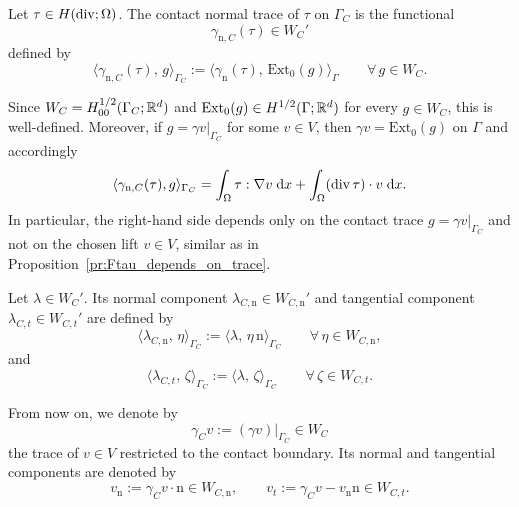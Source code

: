\begin{definition}\label{def:normtang}
	Let $\tau\in H(\diver;\Omega)$. The contact normal trace of $\tau$ on $\Gamma_C$ is the functional
	\begin{equation*}
		\gamma_{\mathrm n,C}(\tau)\in W_C'
	\end{equation*}
	defined by
	\begin{equation*}
		\langle \gamma_{\mathrm n,C}(\tau),\,g\rangle_{\Gamma_C}
		:=
		\langle \gamma_{\mathrm n}(\tau),\,\mathrm{Ext}_0(g)\rangle_\Gamma
		\qquad
		\forall\, g\in W_C.
	\end{equation*}
\end{definition}

Since $W_C = H^{1/2}_{00}(\Gamma_C;{\mathbb R}^d)$ and $\mathrm{Ext}_0(g)\in H^{1/2}(\Gamma;{\mathbb R}^d)$ for every $g\in W_C$, this is well-defined. Moreover, if $g=\gamma v|_{\Gamma_C}$ for some $v\in V$, then $\gamma v=\mathrm{Ext}_0(g)$ on $\Gamma$ and accordingly
\begin{equation*}
	\langle \gamma_{\mathrm n,C}(\tau),g\rangle_{\Gamma_C}
	=
	\int_\Omega \tau:\nabla v\;\dx
	+
	\int_\Omega (\diver\tau)\cdot v\;\dx.
\end{equation*}
In particular, the right-hand side depends only on the contact trace $g=\gamma v|_{\Gamma_C}$ and not on the chosen lift $v\in V$, similar as in Proposition~\ref{pr:Ftau_depends_on_trace}.
\begin{definition}
	Let $\lambda\in W_C'$. Its normal component $\lambda_{C,\mathrm{n}}\in W_{C,\mathrm n}'$ and tangential component $\lambda_{C,t}\in W_{C,t}'$ are defined by
	\begin{equation*}
		\langle \lambda_{C,\mathrm{n}},\,\eta\rangle_{\Gamma_C}
		:=
		\langle \lambda,\,\eta \,\mathrm{n}\rangle_{\Gamma_C}
		\qquad
		\forall\,\eta\in W_{C,\mathrm n},
	\end{equation*}
	and
	\begin{equation*}
		\langle \lambda_{C,t},\,\zeta\rangle_{\Gamma_C}
		:=
		\langle \lambda,\,\zeta\rangle_{\Gamma_C}
		\qquad
		\forall\,\zeta\in W_{C,t}.
	\end{equation*}
\end{definition}
From now on, we denote by
\begin{equation*}
	\gamma_C v := (\gamma v)|_{\Gamma_C} \in W_C
\end{equation*}
the trace of $v \in V$ restricted to the contact boundary. Its normal and tangential components are denoted by
\begin{equation*}
	v_{\mathrm n} := \gamma_C v \cdot \mathrm n \in W_{C,\mathrm n},
	\qquad
	v_t := \gamma_C v - v_{\mathrm n}\mathrm n \in W_{C,t}.
\end{equation*}
